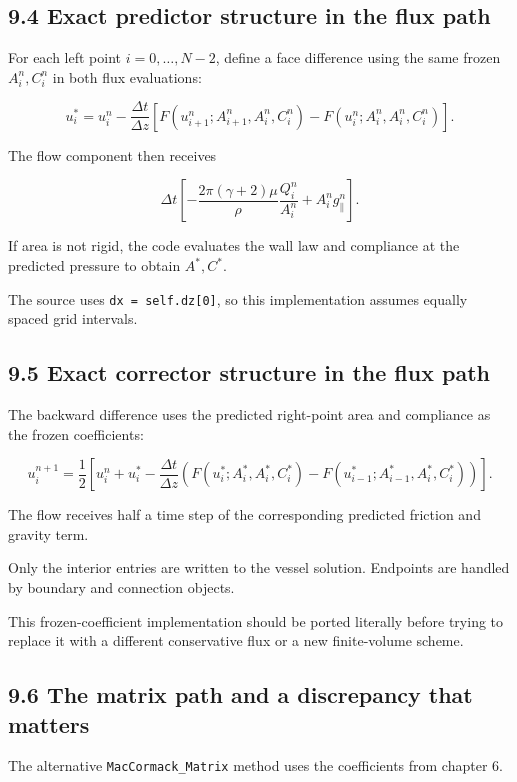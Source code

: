 \documentclass[11pt,a4paper]{article}
\begin{document}
\subsection{9.4 Exact predictor structure in the flux path}
For each left point \(i=0,\ldots,N-2\), define a face difference using the same frozen \(A_i^n,C_i^n\) in both flux evaluations:


\begingroup\small
\[
u_i^*=u_i^n
-\frac{\Delta t}{\Delta z}
\left[
F(u_{i+1}^n;A_{i+1}^n,A_i^n,C_i^n)
-
F(u_i^n;A_i^n,A_i^n,C_i^n)
\right].
\]
\endgroup


The flow component then receives


\begingroup\small
\[
\Delta t\left[
-\frac{2\pi(\gamma+2)\mu}{\rho}\frac{Q_i^n}{A_i^n}
+A_i^n g_\parallel^n
\right].
\]
\endgroup


If area is not rigid, the code evaluates the wall law and compliance at the predicted pressure to obtain \(A^*,C^*\).

The source uses \texttt{dx = self.\allowbreak{}dz[0]}, so this implementation assumes equally spaced grid intervals.

\subsection{9.5 Exact corrector structure in the flux path}
The backward difference uses the predicted right-point area and compliance as the frozen coefficients:


\begingroup\small
\[
u_i^{n+1}
=\frac12\left[
u_i^n+u_i^*
-\frac{\Delta t}{\Delta z}
\left(
F(u_i^*;A_i^*,A_i^*,C_i^*)
-F(u_{i-1}^*;A_{i-1}^*,A_i^*,C_i^*)
\right)
\right].
\]
\endgroup


The flow receives half a time step of the corresponding predicted friction and gravity term.

Only the interior entries are written to the vessel solution. Endpoints are handled by boundary and connection objects.

This frozen-coefficient implementation should be ported literally before trying to replace it with a different conservative flux or a new finite-volume scheme.

\subsection{9.6 The matrix path and a discrepancy that matters}
The alternative \texttt{MacCormack\_\allowbreak{}Matrix} method uses the coefficients from chapter 6.
\end{document}
